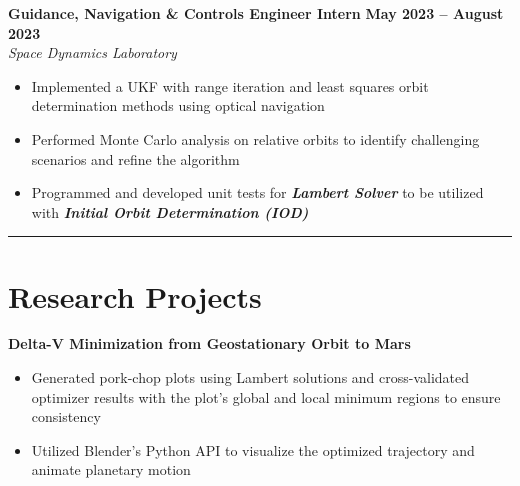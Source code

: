 \documentclass[10pt]{article}
\newcommand{\sectionline}{\noindent\rule{\linewidth}{0.4pt}}
\begin{document}
	\textbf{Guidance, Navigation \& Controls Engineer Intern} \hfill \textbf{May 2023 – August 2023} \\
	\emph{Space Dynamics Laboratory}
	\begin{itemize}
	    \item Implemented a UKF with range iteration and least squares orbit determination methods using optical navigation
	    \item Performed Monte Carlo analysis on relative orbits to identify challenging scenarios and refine the algorithm
	    \item Programmed and developed unit tests for \textbf{\emph{Lambert Solver}} to be utilized with \textbf{\emph{Initial Orbit Determination (IOD)}}
	\end{itemize}
	
	\sectionline
	
	\section*{Research Projects}
	
	\textbf{Delta-V Minimization from Geostationary Orbit to Mars}
	\begin{itemize}
		\item Generated pork-chop plots using Lambert solutions and cross-validated optimizer results with the plot’s global and local minimum regions to ensure consistency
		\item Utilized Blender’s Python API to visualize the optimized trajectory and animate planetary motion
	\end{itemize}
	
\end{document}
